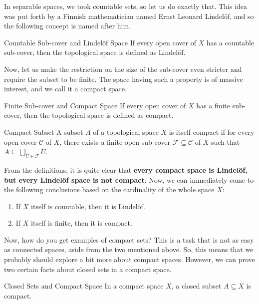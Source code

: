 \noindent  In separable spaces, we took countable sets, so let us do exactly that. This idea was put forth by a Finnish mathematician named Ernst Leonard Lindelöf, and so the following concept is named after him.
\begin{Definition}{Countable Sub-cover and Lindelöf Space}\label{countable_sub-cover_and_lindelöf_space}
    If every open cover of $X$ has a countable sub-cover, then the topological space is defined as Lindelöf.
\end{Definition}
\noindent Now, let us make the restriction on the size of the sub-cover even stricter and require the subset to be finite. The space having such a property is of massive interest, and we call it a compact space.
\begin{Definition}{Finite Sub-cover and Compact Space}\label{finite_sub-cover_and_compact_space}
    If every open cover of $X$ has a finite sub-cover, then the topological space is defined as compact.
\end{Definition}
\begin{Definition}{Compact Subset}\label{compact_subset}
    A subset $A$ of a topological space $X$ is itself compact if for every open cover $\mathcal{C}$ of $X$, there exists a finite open sub-cover $\mathcal{F\subseteq C}$ of $X$ such that $A\subseteq\bigcup_{U\in \mathcal{F}}U$.
\end{Definition}
\noindent From the definitions, it is quite clear that \textbf{every compact space is Lindelöf, but every Lindelöf space is not compact}. Now, we can immediately come to the following conclusions based on the cardinality of the whole space $X$:
\begin{enumerate}
    \item If $X$ itself is countable, then it is Lindelöf.
    \item If $X$ itself is finite, then it is compact.
\end{enumerate}
Now, how do you get examples of compact sets? This is a task that is not as easy as connected spaces, aside from the two mentioned above. So, this means that we probably should explore a bit more about compact spaces. However, we can prove two certain facts about closed sets in a compact space.
\begin{Theorem}{Closed Sets and Compact Space}\label{closed_set_and_compact_set}
    In a compact space $X$, a closed subset $A\subseteq X$ is compact.
\end{Theorem}

